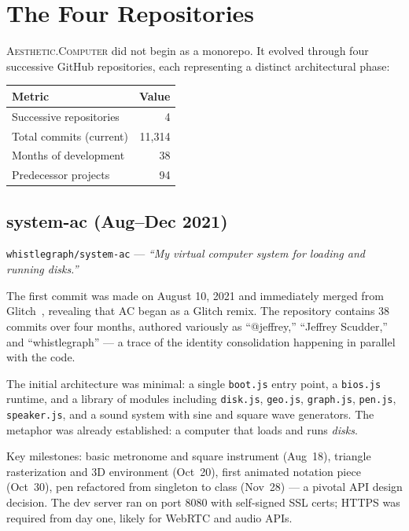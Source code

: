 \documentclass[10pt,letterpaper,twocolumn]{article}
\newcommand{\ac}{\textsc{Aesthetic.Computer}}
\begin{document}

\section{The Four Repositories}

\ac{} did not begin as a monorepo. It evolved through four successive GitHub repositories, each representing a distinct architectural phase:

\begin{table}[h]
\small
\centering
\begin{tabular}{lr}
\toprule
\textbf{Metric} & \textbf{Value} \\
\midrule
Successive repositories & 4 \\
Total commits (current) & 11,314 \\
Months of development & 38 \\
Predecessor projects & 94 \\
\bottomrule
\end{tabular}
\end{table}

\subsection{system-ac (Aug--Dec 2021)}

\texttt{whistlegraph/system-ac} --- \emph{``My virtual computer system for loading and running disks.''}

The first commit was made on August 10, 2021 and immediately merged from Glitch~\citep{glitch2017}, revealing that AC began as a Glitch remix. The repository contains 38 commits over four months, authored variously as ``@jeffrey,'' ``Jeffrey Scudder,'' and ``whistlegraph'' --- a trace of the identity consolidation happening in parallel with the code.

The initial architecture was minimal: a single \texttt{boot.js} entry point, a \texttt{bios.js} runtime, and a library of modules including \texttt{disk.js}, \texttt{geo.js}, \texttt{graph.js}, \texttt{pen.js}, \texttt{speaker.js}, and a sound system with sine and square wave generators. The metaphor was already established: a computer that loads and runs \emph{disks}.

Key milestones: basic metronome and square instrument (Aug~18), triangle rasterization and 3D environment (Oct~20), first animated notation piece (Oct~30), pen refactored from singleton to class (Nov~28) --- a pivotal API design decision. The dev server ran on port 8080 with self-signed SSL certs; HTTPS was required from day one, likely for WebRTC and audio APIs.
\end{document}
